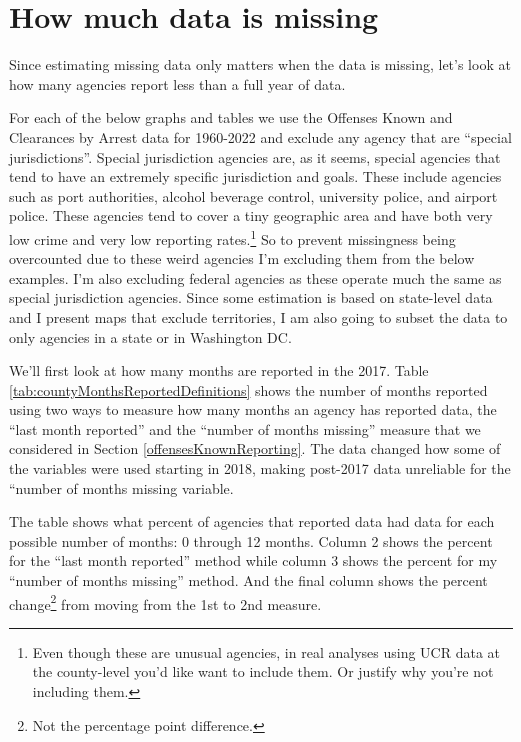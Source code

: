 \documentclass[
]{krantz}
\begin{document}
\section{How much data is
missing}\label{how-much-data-is-missing}

Since estimating missing data only matters when the data is
missing, let's look at how many agencies report less than a
full year of data.

For each of the below graphs and tables we use the Offenses
Known and Clearances by Arrest data for 1960-2022 and
exclude any agency that are ``special jurisdictions''.
Special jurisdiction agencies are, as it seems, special
agencies that tend to have an extremely specific
jurisdiction and goals. These include agencies such as port
authorities, alcohol beverage control, university police,
and airport police. These agencies tend to cover a tiny
geographic area and have both very low crime and very low
reporting rates.\footnote{Even though these are unusual
  agencies, in real analyses using UCR data at the
  county-level you'd like want to include them. Or justify
  why you're not including them.} So to prevent missingness
being overcounted due to these weird agencies I'm excluding
them from the below examples. I'm also excluding federal
agencies as these operate much the same as special
jurisdiction agencies. Since some estimation is based on
state-level data and I present maps that exclude
territories, I am also going to subset the data to only
agencies in a state or in Washington DC.

We'll first look at how many months are reported in the
2017. Table \ref{tab:countyMonthsReportedDefinitions} shows
the number of months reported using two ways to measure how
many months an agency has reported data, the ``last month
reported'' and the ``number of months missing'' measure that
we considered in Section \ref{offensesKnownReporting}. The
data changed how some of the variables were used starting in
2018, making post-2017 data unreliable for the ``number of
months missing variable.

The table shows what percent of agencies that reported data
had data for each possible number of months: 0 through 12
months. Column 2 shows the percent for the ``last month
reported'' method while column 3 shows the percent for my
``number of months missing'' method. And the final column
shows the percent change\footnote{Not the percentage point
  difference.} from moving from the 1st to 2nd measure.
\end{document}
